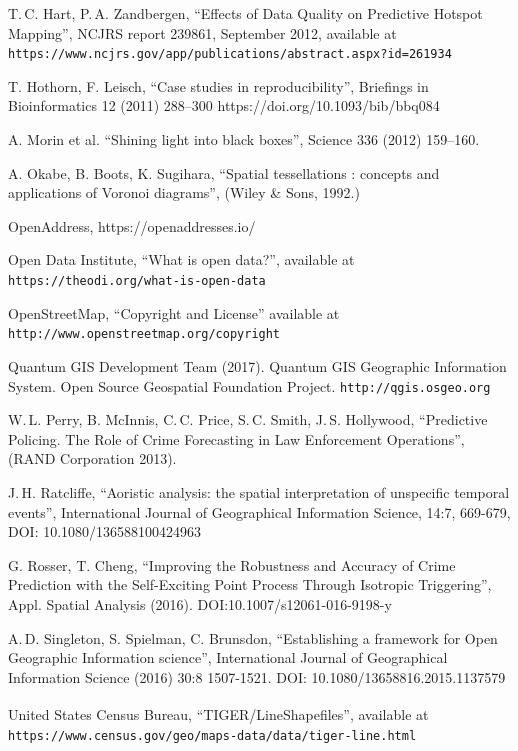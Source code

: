 \documentclass[twoside,a4paper,twocolumn,10pt]{article}
\theoremstyle{plain}
\theoremstyle{definition}
\newcommand{\regsym}{\textsuperscript{\textregistered}}
\begin{document}
\begin{thebibliography}{99}
 T.\,C. Hart, P.\,A. Zandbergen,
  ``Effects of Data Quality on Predictive Hotspot Mapping'',
  NCJRS report 239861, September 2012, available at
  \texttt{https://www.ncjrs.gov/app/publications/abstract.aspx?id=261934}

 T. Hothorn, F. Leisch, ``Case studies in reproducibility'',
  Briefings in Bioinformatics 12 (2011) 288--300 https://doi.org/10.1093/bib/bbq084

 A. Morin et al. ``Shining light into black boxes'',
  Science 336 (2012) 159--160.

 A. Okabe, B. Boots, K. Sugihara,
  ``Spatial tessellations : concepts and applications of Voronoi diagrams'',
  (Wiley \& Sons, 1992.)

 OpenAddress, https://openaddresses.io/

 Open Data Institute, ``What is open data?'', available at
   \texttt{https://theodi.org/what-is-open-data}

 OpenStreetMap, ``Copyright and License'' available at
   \texttt{http://www.openstreetmap.org/copyright}

 Quantum GIS Development Team (2017).
  Quantum GIS Geographic Information System. Open Source Geospatial Foundation Project. \texttt{http://qgis.osgeo.org}

 W.\,L. Perry, B. McInnis, C.\,C. Price, S.\,C. Smith, J.\,S. Hollywood,
        ``Predictive Policing. The Role of Crime Forecasting in Law Enforcement Operations'',
        (RAND Corporation 2013).

 J.\,H. Ratcliffe, ``Aoristic analysis: the spatial interpretation of unspecific
temporal events'', International Journal of Geographical Information Science, 14:7, 669-679, DOI:
10.1080/136588100424963

 G. Rosser, T. Cheng, ``Improving the Robustness and Accuracy of Crime
   Prediction with the Self-Exciting Point Process Through Isotropic Triggering'',
   Appl. Spatial Analysis (2016). DOI:10.1007/s12061-016-9198-y

 A.\,D. Singleton, S. Spielman, C. Brunsdon,
   ``Establishing a framework for Open Geographic Information science'',
   International Journal of Geographical Information Science (2016) 30:8 1507-1521.
   DOI: 10.1080/13658816.2015.1137579

 United States Census Bureau, ``TIGER/Line\regsym Shapefiles'',
   available at \texttt{https://www.census.gov/geo/maps-data/data/tiger-line.html}

\end{thebibliography}
\end{document}

